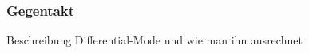 \subsubsection{Gegentakt} \label{subsec:gegentakt}
Beschreibung Differential-Mode und wie man ihn ausrechnet